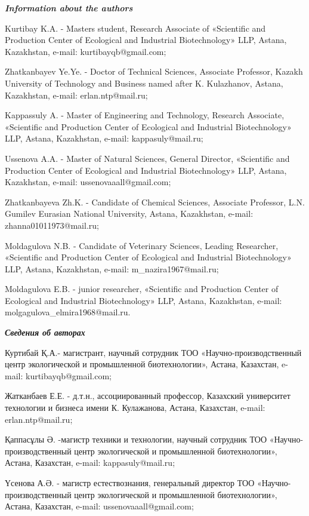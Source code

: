 \emph{{\bfseries Information about the authors}}

Kurtibay K.A. - Master\textquotesingle s student, Research Associate of
«Scientific and Production Center of Ecological and Industrial
Biotechnology» LLP, Astana, Kazakhstan, e-mail: kurtibayqb@gmail.com;

Zhatkanbayev Ye.Ye. - Doctor of Technical Sciences, Associate Professor,
Kazakh University of Technology and Business named after K. Kulazhanov,
Astana, Kazakhstan, e-mail: erlan.ntp@mail.ru;

Kappassuly A. - Master of Engineering and Technology, Research
Associate, «Scientific and Production Center of Ecological and
Industrial Biotechnology» LLP, Astana, Kazakhstan, e-mail:
kappasuly@mail.ru;

Ussenova A.A. - Master of Natural Sciences, General Director,
«Scientific and Production Center of Ecological and Industrial
Biotechnology» LLP, Astana, Kazakhstan, e-mail: ussenovaaall@gmail.com;

Zhatkanbayeva Zh.K. - Candidate of Chemical Sciences, Associate
Professor, L.N. Gumilev Eurasian National University, Astana,
Kazakhstan, e-mail: zhanna01011973@mail.ru;

Moldagulova N.B. - Candidate of Veterinary Sciences, Leading Researcher,
«Scientific and Production Center of Ecological and Industrial
Biotechnology» LLP, Astana, Kazakhstan, e-mail: m\_nazira1967@mail.ru;

Moldagulova E.B. - junior researcher, «Scientific and Production Center
of Ecological and Industrial Biotechnology» LLP, Astana, Kazakhstan,
e-mail: molgagulova\_elmira1968@mail.ru.

\emph{{\bfseries Сведения об авторах}}

Куртибай Қ.А.- магистрант, научный сотрудник ТОО
«Научно-производственный центр экологической и промышленной
биотехнологии», Астана, Казахстан, e-mail: kurtibayqb@gmail.com;

Жатканбаев Е.Е. - д.т.н., ассоциированный профессор, Казахский
университет технологии и бизнеса имени К. Кулажанова, Астана, Казахстан,
e-mail: erlan.ntp@mail.ru;

Қаппасұлы Ә. -магистр техники и технологии, научный сотрудник ТОО
«Научно-производственный центр экологической и промышленной
биотехнологии», Астана, Казахстан, e-mail: kappasuly@mail.ru;

Үсенова А.Ә. - магистр естествознания, генеральный директор ТОО
«Научно-производственный центр экологической и промышленной
биотехнологии», Астана, Казахстан, e-mail: ussenovaaall@gmail.com;

